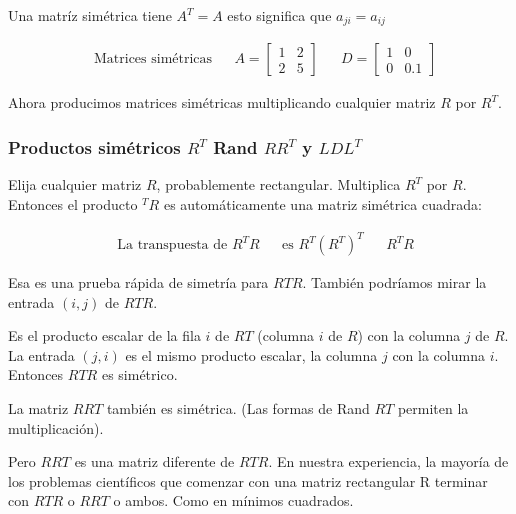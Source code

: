 \begin{definition}
	Una matríz simétrica tiene $A^T=A$ esto significa que $a_{ji}=a_{ij}$
\end{definition}

\begin{align}
	 & \text{Matrices simétricas} &  & A=\begin{bmatrix}
		                                     1 & 2 \\2&5
	                                     \end{bmatrix} &  & D=\begin{bmatrix}
		                                                          1 & 0 \\0&0.1
	                                                          \end{bmatrix}
\end{align}

Ahora producimos matrices simétricas multiplicando cualquier matriz $R$ por $R^T$.

\subsubsection{Productos simétricos $R^T$ Rand $RR^T$ y $LDL^T$}

Elija cualquier matriz $R$, probablemente rectangular. Multiplica $R^T$ por $R$. Entonces el producto $^T R$
es automáticamente una matriz simétrica cuadrada:

\begin{align}
	 & \text{La transpuesta de } R^TR &  & \text{es }R^T(R^T)^T &  & R^TR
\end{align}

Esa es una prueba rápida de simetría para $RT R$. También podríamos mirar la entrada $(i, j)$ de $RT R$.

Es el producto escalar de la fila $i$ de $RT$ (columna $i$ de $R$) con la columna $j$ de $R$. La entrada $(j, i)$
es el mismo producto escalar, la columna $j$ con la columna $i$. Entonces $RT R$ es simétrico.

La matriz $RRT$ también es simétrica. (Las formas de Rand $RT$ permiten la multiplicación).

Pero $RRT$ es una matriz diferente de $RT R$. En nuestra experiencia, la mayoría de los problemas científicos que
comenzar con una matriz rectangular R terminar con $RT R$ o $RRT$ o ambos. Como en mínimos cuadrados.

